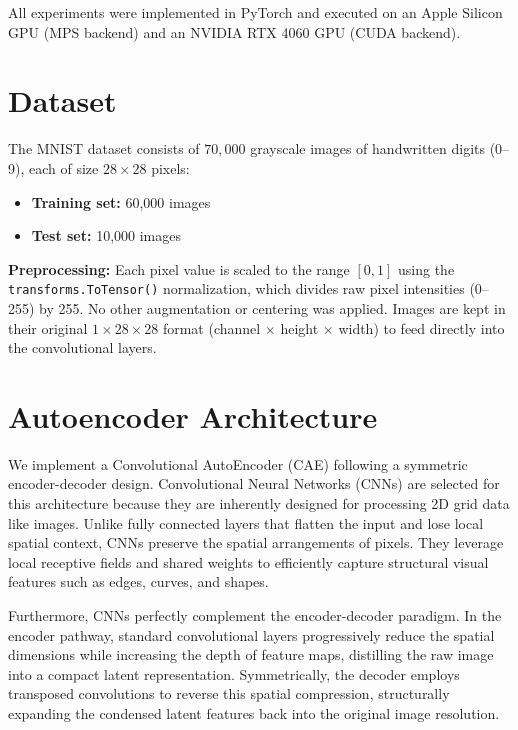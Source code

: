 \documentclass[12pt,a4paper]{article}
\begin{document}
All experiments were implemented in PyTorch and executed on an Apple Silicon GPU (MPS backend) and an NVIDIA RTX 4060 GPU (CUDA backend).

\section{Dataset}

The MNIST dataset consists of $70{,}000$ grayscale images of handwritten digits (0--9), each of size $28 \times 28$ pixels:
\begin{itemize}
  \item \textbf{Training set:} 60,000 images
  \item \textbf{Test set:} 10,000 images
\end{itemize}

\noindent\textbf{Preprocessing:} Each pixel value is scaled to the range $[0, 1]$ using the \texttt{transforms.ToTensor()} normalization, which divides raw pixel intensities (0--255) by 255. No other augmentation or centering was applied. Images are kept in their original $1\times28\times28$ format (channel $\times$ height $\times$ width) to feed directly into the convolutional layers.

\section{Autoencoder Architecture}

We implement a Convolutional AutoEncoder (CAE) following a symmetric encoder-decoder design. 
Convolutional Neural Networks (CNNs) are selected for this architecture because they are inherently designed for processing 2D grid data like images. Unlike fully connected layers that flatten the input and lose local spatial context, CNNs preserve the spatial arrangements of pixels. They leverage local receptive fields and shared weights to efficiently capture structural visual features such as edges, curves, and shapes.

Furthermore, CNNs perfectly complement the encoder-decoder paradigm. In the encoder pathway, standard convolutional layers progressively reduce the spatial dimensions while increasing the depth of feature maps, distilling the raw image into a compact latent representation. Symmetrically, the decoder employs transposed convolutions to reverse this spatial compression, structurally expanding the condensed latent features back into the original image resolution.
\end{document}
